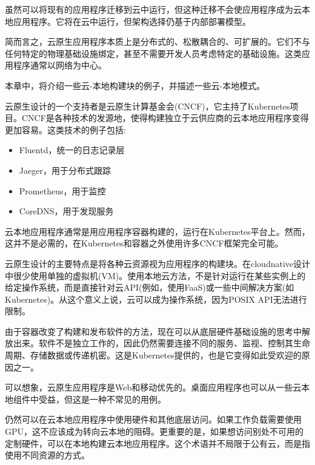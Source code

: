 

虽然可以将现有的应用程序迁移到云中运行，但这种迁移不会使应用程序成为云本地应用程序。它将在云中运行，但架构选择仍基于内部部署模型。

简而言之，云原生应用程序本质上是分布式的、松散耦合的、可扩展的。它们不与任何特定的物理基础设施绑定，甚至不需要开发人员考虑特定的基础设施。这类应用程序通常以网络为中心。

本章中，将介绍一些云-本地构建块的例子，并描述一些云-本地模式。


云原生设计的一个支持者是云原生计算基金会(CNCF)，它主持了Kubernetes项目。CNCF是各种技术的发源地，使得构建独立于云供应商的云本地应用程序变得更加容易。这类技术的例子包括:

\begin{itemize}
\item 
Fluentd，统一的日志记录层

\item 
Jaeger，用于分布式跟踪

\item 
Prometheus，用于监控

\item 
CoreDNS，用于发现服务
\end{itemize}

云本地应用程序通常是用应用程序容器构建的，运行在Kubernetes平台上。然而，这并不是必需的，在Kubernetes和容器之外使用许多CNCF框架完全可能。


云原生设计的主要特点是将各种云资源视为应用程序的构建块。在cloudnative设计中很少使用单独的虚拟机(VM)。使用本地云方法，不是针对运行在某些实例上的给定操作系统，而是直接针对云API(例如，使用FaaS)或一些中间解决方案(如Kubernetes)。从这个意义上说，云可以成为操作系统，因为POSIX API无法进行限制。

由于容器改变了构建和发布软件的方法，现在可以从底层硬件基础设施的思考中解放出来。软件不是独立工作的，因此仍然需要连接不同的服务、监视、控制其生命周期、存储数据或传递机密。这是Kubernetes提供的，也是它变得如此受欢迎的原因之一。

可以想象，云原生应用程序是Web和移动优先的。桌面应用程序也可以从一些云本地组件中受益，但这是一种不常见的用例。

仍然可以在云本地应用程序中使用硬件和其他底层访问。如果工作负载需要使用GPU，这不应该成为转向云本地的阻碍。更重要的是，如果想访问别处不可用的定制硬件，可以在本地构建云本地应用程序。这个术语并不局限于公有云，而是指使用不同资源的方式。

